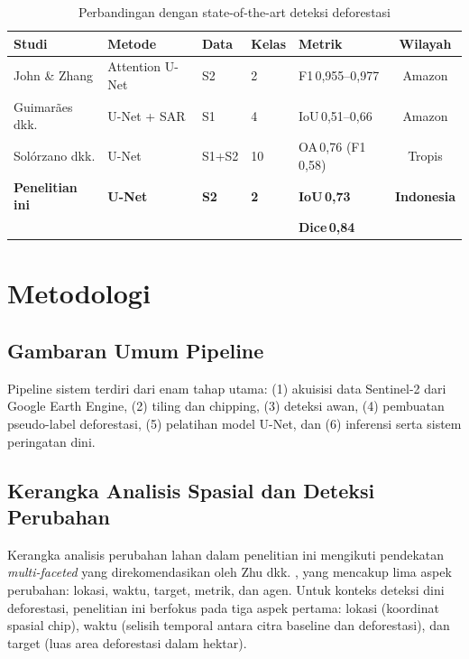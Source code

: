 \documentclass[12pt,a4paper]{article}
\begin{document}
\begin{table}[H]
\centering
\caption{Perbandingan dengan state-of-the-art deteksi deforestasi}
\label{tab:sota}
\small
\begin{tabular}{lp{2.2cm}p{1.5cm}p{0.8cm}p{1.5cm}c}
\toprule
\textbf{Studi} & \textbf{Metode} & \textbf{Data} & \textbf{Kelas} & \textbf{Metrik} & \textbf{Wilayah} \\
\midrule
John \& Zhang
\cite{john2022attention}
& Attention U-Net
& S2
& 2 & F1\,0,955--0,977 & Amazon \\
Guimarães dkk.
\cite{guimaraes2025deep}
& U-Net + SAR
& S1
& 4 & IoU\,0,51--0,66 & Amazon \\
Solórzano dkk.
\cite{solorzano2021lulc}
& U-Net
& S1+S2
& 10 & OA\,0,76 (F1\,0,58) & Tropis \\
\textbf{Penelitian ini}
& \textbf{U-Net}
& \textbf{S2}
& \textbf{2}
& \textbf{IoU\,0,73} &
\textbf{Indonesia} \\
& & & & \textbf{Dice\,0,84} & \\
\bottomrule
\end{tabular}
\end{table}

\section{Metodologi}
\label{sec:metodologi}

\subsection{Gambaran Umum Pipeline}

Pipeline sistem terdiri dari enam tahap utama: (1) akuisisi data Sentinel-2 dari
Google Earth Engine, (2) tiling dan chipping, (3) deteksi awan, (4) pembuatan
pseudo-label deforestasi, (5) pelatihan model U-Net, dan (6) inferensi serta
sistem peringatan dini.

\subsection{Kerangka Analisis Spasial dan Deteksi Perubahan}
\label{subsec:analisis}

Kerangka analisis perubahan lahan dalam penelitian ini mengikuti
pendekatan \textit{multi-faceted} yang direkomendasikan oleh Zhu
dkk. \cite{zhu2022remote}, yang mencakup lima aspek perubahan:
lokasi, waktu, target, metrik, dan agen. Untuk konteks deteksi
dini deforestasi, penelitian ini berfokus pada tiga aspek pertama:
lokasi (koordinat spasial chip), waktu (selisih temporal antara
citra baseline dan deforestasi), dan target (luas area deforestasi
dalam hektar).
\end{document}
